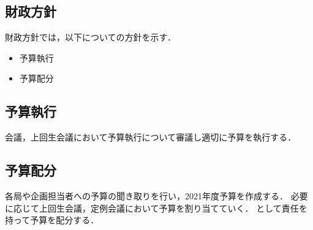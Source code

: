 \subsection*{財政方針}


財政方針では，以下についての方針を示す．
\begin{itemize}
  \item 予算執行
  \item 予算配分
\end{itemize}

\subsection*{予算執行}
\kaikeiDepartment{}会議，上回生会議において予算執行について審議し適切に予算を執行する．

\subsection*{予算配分}
各局や企画担当者への予算の聞き取りを行い，2021年度予算を作成する．
必要に応じて上回生会議，定例会議において予算を割り当てていく．
\kaikeiDepartment{}として責任を持って予算を配分する．